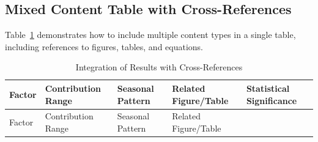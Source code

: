 \documentclass[
  letterpaper,
  oneside,
  openany]{MastersDoctoralThesis}
\theoremstyle{plain}
\theoremstyle{remark}
\begin{document}
\subsection{Mixed Content Table with
Cross-References}\label{sec-ch1-mixed-table}

Table~\ref{tbl-ch1-mixed} demonstrates how to include multiple content
types in a single table, including references to figures, tables, and
equations.

\begin{longtable}[]{@{}
  >{\raggedright\arraybackslash}p{}
  >{\raggedright\arraybackslash}p{}
  >{\raggedright\arraybackslash}p{}
  >{\raggedright\arraybackslash}p{}
  >{\raggedright\arraybackslash}p{}@{}}
\caption{Integration of Results with
Cross-References}\label{tbl-ch1-mixed}\tabularnewline
\toprule\noalign{}
\begin{minipage}[b]{\linewidth}\raggedright
Factor
\end{minipage} & \begin{minipage}[b]{\linewidth}\raggedright
Contribution Range
\end{minipage} & \begin{minipage}[b]{\linewidth}\raggedright
Seasonal Pattern
\end{minipage} & \begin{minipage}[b]{\linewidth}\raggedright
Related Figure/Table
\end{minipage} & \begin{minipage}[b]{\linewidth}\raggedright
Statistical Significance
\end{minipage} \\
\midrule\noalign{}
\endfirsthead
\toprule\noalign{}
\begin{minipage}[b]{\linewidth}\raggedright
Factor
\end{minipage} & \begin{minipage}[b]{\linewidth}\raggedright
Contribution Range
\end{minipage} & \begin{minipage}[b]{\linewidth}\raggedright
Seasonal Pattern
\end{minipage} & \begin{minipage}[b]{\linewidth}\raggedright
Related Figure/Table
\end{minipage} & \begin{minipage}[b]{\linewidth}\raggedright

\end{minipage}
\end{longtable}
\end{document}
